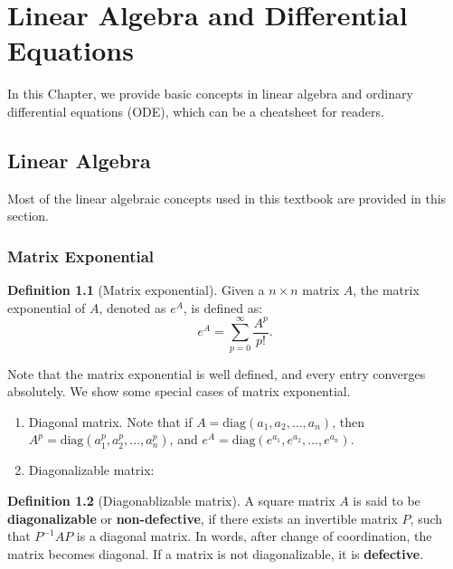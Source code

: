 \documentclass[
]{book}
\theoremstyle{definition}
\newtheorem{definition}{Definition}[chapter]
\theoremstyle{definition}
\theoremstyle{definition}
\theoremstyle{definition}
\theoremstyle{remark}
\begin{document}
\hypertarget{linear-algebra-and-differential-equations}{%
\chapter{Linear Algebra and Differential Equations}\label{linear-algebra-and-differential-equations}}

In this Chapter, we provide basic concepts in linear algebra and ordinary differential equations (ODE), which can be a cheatsheet for readers.

\hypertarget{linear-algebra}{%
\section{Linear Algebra}\label{linear-algebra}}

Most of the linear algebraic concepts used in this textbook are provided in this section.

\hypertarget{matrix-exponential}{%
\subsection{Matrix Exponential}\label{matrix-exponential}}

\begin{definition}[Matrix exponential]
\protect\hypertarget{def:matrixexp}{}\label{def:matrixexp}Given a \(n\times n\) matrix \(A\), the matrix exponential of \(A\), denoted as \(e^A\), is defined as:
\[e^A = \sum_{p=0}^\infty \frac{A^p}{p!}.\]
\end{definition}

Note that the matrix exponential is well defined, and every entry converges absolutely. We show some special cases of matrix exponential.

\begin{enumerate}
\def\labelenumi{\arabic{enumi}.}
\item
  Diagonal matrix. Note that if \(A=\text{diag}(a_1,a_2,\ldots,a_n)\), then \(A^p=\text{diag}(a_1^p,a_2^p,\ldots,a_n^p)\), and \(e^A=\text{diag}(e^{a_1},e^{a_2},\ldots,e^{a_n})\).
\item
  Diagonalizable matrix:
\end{enumerate}

\begin{definition}[Diagonablizable matrix]
\protect\hypertarget{def:diagonaliable}{}\label{def:diagonaliable}A square matrix \(A\) is said to be \textbf{diagonalizable} or \textbf{non-defective}, if there exists an invertible matrix \(P\), such that \(P^{-1}AP\) is a diagonal matrix. In words, after change of coordination, the matrix becomes diagonal. If a matrix is not diagonalizable, it is \textbf{defective}.
\end{definition}
\end{document}

